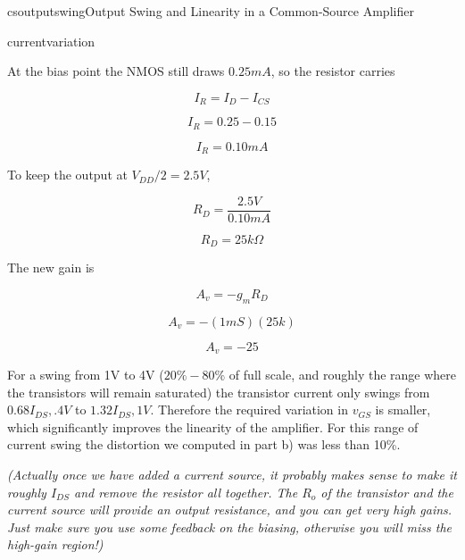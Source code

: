 \begin{mainquestion}{csoutputswing}{Output Swing and Linearity in a Common-Source Amplifier}
\begin{partquestion}{currentvariation}
\begin{answer}[3.5in]
At the bias point the NMOS still draws $0.25mA$, so the resistor carries

\[
I_R = I_D - I_{CS}
\]

\[
I_R = 0.25 - 0.15
\]

\[
I_R = 0.10mA
\]

To keep the output at $V_{DD}/2=2.5V$,

\[
R_D = \frac{2.5V}{0.10mA}
\]

\[
R_D = 25k\Omega
\]

The new gain is

\[
A_v = -g_m R_D
\]

\[
A_v = -(1mS)(25k)
\]

\[
A_v = -25
\]

For a swing from 1V to 4V ($20\%-80\%$ of full scale, and roughly the range where the transistors will remain saturated) the transistor current only swings from $0.68 I_{DS}, .4V$ to $1.32I_{DS}, 1V$. Therefore the required variation in $v_{GS}$ is smaller, which significantly improves the linearity of the amplifier. For this range of current swing the distortion we computed in part b) was less than 10\%.  
\end{answer}

\textit{(Actually once we have added a current source, it probably makes sense to make it roughly $I_{DS}$ and remove the resistor all together.  The $R_o$ of the transistor and the current source will provide an output resistance, and you can get very high gains.  Just make sure you use some feedback on the biasing, otherwise you will miss the high-gain region!)}
\end{partquestion}

\end{mainquestion}
